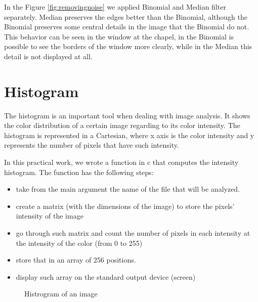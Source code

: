 \documentclass{article}
\begin{document}
	In the Figure \ref{fig:removingnoise} we applied Binomial and Median filter separately. 
	Median preserves the edges better than the Binomial, although the Binomial preserves some central details in the image that the Binomial do not. 
	This behavior can be seen in the window at the chapel, in the Binomial is possible to see the borders of the window more clearly, while in the Median this detail is not displayed at all. 

\section{Histogram}

	The histogram is an important tool when dealing with image analysis. It shows the color distribution of a certain image regarding to its color intensity. The 		histogram is represented in a Cartesian, where x axis is the color intensity and y represents the number of pixels that have such intensity.

	In this practical work, we wrote a function in c that computes the intensity histogram. The function has the following steps:
	\begin{itemize}
  		\item take from the main argument the name of the file that will be analyzed.
  		\item create a matrix (with the dimensions of the image) to store the pixels' intensity of the image
  		\item go through such matrix and count the number of pixels in each intensity at the intensity of the color (from 0 to 255)
  		\item store that in an array of 256 positions.
  		\item display such array on the standard output device (screen)
	\end{itemize}

	\begin{figure}[H]
	\centering
	\caption{Histrogram of an image}
	\label{fig:equalizing}
	\end{figure}
\end{document}

